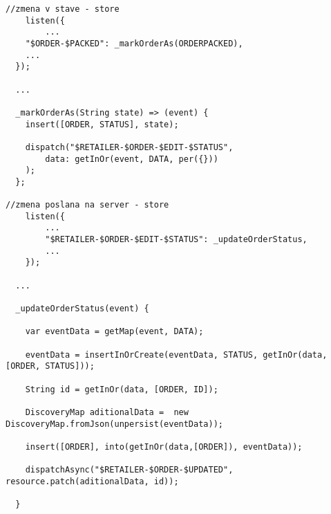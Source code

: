 
\begin{lstlisting}[caption=Dotaz na server vo Flux-e v store, label={lst:fetchDart}]
//zmena v stave - store
	listen({
		...
    "$ORDER-$PACKED": _markOrderAs(ORDERPACKED),
    ...
  });

  ...

  _markOrderAs(String state) => (event) {
    insert([ORDER, STATUS], state);

    dispatch("$RETAILER-$ORDER-$EDIT-$STATUS",
        data: getInOr(event, DATA, per({}))
    );
  };

//zmena poslana na server - store
	listen({
		...
		"$RETAILER-$ORDER-$EDIT-$STATUS": _updateOrderStatus,
		...
	});

  ...

  _updateOrderStatus(event) {

    var eventData = getMap(event, DATA);

    eventData = insertInOrCreate(eventData, STATUS, getInOr(data, [ORDER, STATUS]));

    String id = getInOr(data, [ORDER, ID]);

    DiscoveryMap aditionalData =  new DiscoveryMap.fromJson(unpersist(eventData));

    insert([ORDER], into(getInOr(data,[ORDER]), eventData));

    dispatchAsync("$RETAILER-$ORDER-$UPDATED", resource.patch(aditionalData, id));

  }
\end{lstlisting}

